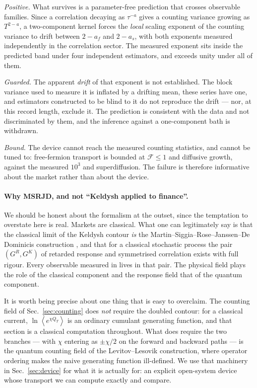 \documentclass[aps,pre,twocolumn,superscriptaddress,floatfix,nofootinbib]{revtex4-2}
\newcommand{\avg}[1]{\left\langle #1 \right\rangle}
\begin{document}
\emph{Positive.} What survives is a parameter-free prediction that crosses
observable families. Since a correlation decaying as $\tau^{-a}$ gives a
counting variance growing as $T^{2-a}$, a two-component kernel forces the
\emph{local} scaling exponent of the counting variance to drift between
$2-a_f$ and $2-a_s$, with both exponents measured independently in the
correlation sector. The measured exponent sits inside the predicted band under
four independent estimators, and exceeds unity under all of them.

\emph{Guarded.} The apparent \emph{drift} of that exponent is not established.
The block variance used to measure it is inflated by a drifting mean, these
series have one, and estimators constructed to be blind to it do not reproduce
the drift --- nor, at this record length, exclude it. The prediction is
consistent with the data and not discriminated by them, and the inference
against a one-component bath is withdrawn.

\emph{Bound.} The device cannot reach the measured counting statistics, and
cannot be tuned to: free-fermion transport is bounded at $\mathcal{F}\le1$ and
diffusive growth, against the measured $10^3$ and superdiffusion. The failure
is therefore informative about the market rather than about the device.

\paragraph*{Why MSRJD, and not ``Keldysh applied to finance''.}
We should be honest about the formalism at the outset, since the temptation to
overstate here is real. Markets are classical. What one can legitimately say is
that the classical limit of the Keldysh contour \emph{is} the
Martin--Siggia--Rose--Janssen--De\,Dominicis construction
\cite{martin1973,janssen1976,dedominicis1976,kamenev2011}, and that for a
classical stochastic process the pair $(G^R,G^K)$ of retarded response and
symmetrised correlation exists with full rigour. Every observable measured in
\cite{paper1} lives in that pair. The physical field plays the role of the
classical component and the response field that of the quantum component.

It is worth being precise about one thing that is easy to overclaim. The
counting field of Sec.~\ref{sec:counting} does \emph{not} require the doubled
contour: for a classical current, $\ln\avg{e^{\chi Q_T}}$ is an ordinary
cumulant generating function, and that section is a classical computation
throughout. What does require the two branches --- with $\chi$ entering as
$\pm\chi/2$ on the forward and backward paths --- is the quantum counting field
of the Levitov--Lesovik construction, where operator ordering makes the naive
generating function ill-defined. We use that machinery in
Sec.~\ref{sec:device} for what it is actually for: an explicit open-system
device whose transport we can compute exactly and compare.
\end{document}

